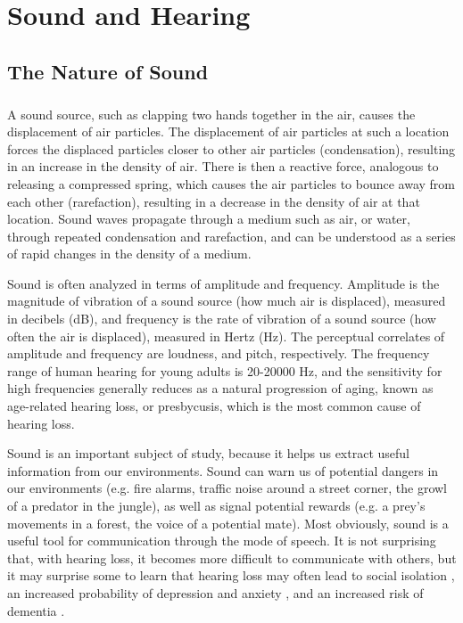 \chapter{Sound and Hearing}

\section{The Nature of Sound}
\paragraph{}A sound source, such as clapping two hands together in the air, causes the displacement of air particles.  The displacement of air particles at such a location forces the displaced particles closer to other air particles (condensation), resulting in an increase in the density of air.  There is then a reactive force, analogous to releasing a compressed spring, which causes the air particles to bounce away from each other (rarefaction), resulting in a decrease in the density of air at that location.  Sound waves propagate through a medium such as air, or water, through repeated condensation and rarefaction, and can be understood as a series of rapid changes in the density of a medium.

Sound is often analyzed in terms of amplitude and frequency.  Amplitude is the magnitude of vibration of a sound source (how much air is displaced), measured in decibels (dB), and frequency is the rate of vibration of a sound source (how often the air is displaced), measured in Hertz (Hz).  The perceptual correlates of amplitude and frequency are loudness, and pitch, respectively.  The frequency range of human hearing for young adults is 20-20000 Hz, and the sensitivity for high frequencies generally reduces as a natural progression of aging, known as age-related hearing loss, or presbycusis, which is the most common cause of hearing loss.

Sound is an important subject of study, because it helps us extract useful information from our environments.  Sound can warn us of potential dangers in our environments (e.g. fire alarms, traffic noise around a street corner, the growl of a predator in the jungle), as well as signal potential rewards (e.g. a prey's movements in a forest, the voice of a potential mate).  Most obviously, sound is a useful tool for communication through the mode of speech.  It is not surprising that, with hearing loss, it becomes more difficult to communicate with others, but it may surprise some to learn that hearing loss may often lead to social isolation \cite{Weinstein1982}, an increased probability of depression and anxiety \cite{Tambs2004}, and an increased risk of dementia \cite{Lin2011}.

